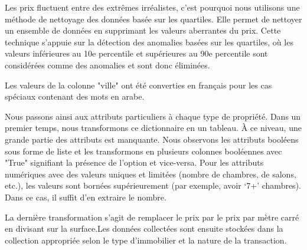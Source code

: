 \documentclass[a4paper,12pt]{report}
\numberwithin{equation}{section}
\begin{document}
Les prix fluctuent entre des extrêmes irréalistes, c’est pourquoi nous utilisons une méthode de nettoyage des données basée sur les quartiles. Elle permet de nettoyer un ensemble de données en supprimant les valeurs aberrantes du prix. Cette technique s'appuie sur la détection des anomalies basées sur les quartiles, où les valeurs inférieures au 10e percentile et supérieures au 90e percentile sont considérées comme des anomalies et sont donc éliminées.
\par
Les valeurs de la colonne "ville" ont été converties en français pour les cas spéciaux contenant des mots en arabe.
\\ \par
Nous passons ainsi aux attributs particuliers à chaque type de propriété. Dans un premier temps, nous transformons ce dictionnaire en un tableau. À ce niveau, une grande partie des attributs est manquante. Nous observons les attributs booléens sous forme de liste et les transformons en plusieurs colonnes booléennes avec "True" signifiant la présence de l’option et vice-versa. Pour les attributs numériques avec des valeurs uniques et limitées (nombre de chambres, de salons, etc.), les valeurs sont bornées supérieurement (par exemple, avoir ‘7+’ chambres). Dans ce cas, il suffit d'en extraire le nombre.
\\ \par
La dernière transformation s’agit de remplacer le prix par le prix par mètre carré en divisant sur la surface.Les données collectées sont ensuite stockées dans la collection appropriée selon le type d’immobilier et la nature de la transaction.
\end{document}
